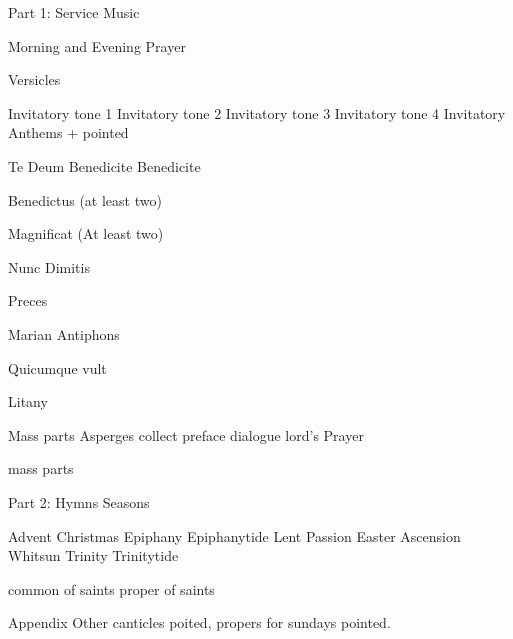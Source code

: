 Part 1: Service Music

Morning and Evening Prayer

Versicles

Invitatory tone 1
Invitatory tone 2
Invitatory tone 3
Invitatory tone 4
Invitatory Anthems + pointed

Te Deum
Benedicite
Benedicite

Benedictus (at least two)

Magnificat (At least two)

Nunc Dimitis

Preces

Marian Antiphons
 
Quicumque vult

Litany

Mass parts
Asperges
collect
preface dialogue
lord's Prayer

mass parts


Part 2: Hymns
Seasons

Advent
Christmas
Epiphany
Epiphanytide
Lent
Passion
Easter
Ascension
Whitsun
Trinity
Trinitytide

common of saints
proper of saints

Appendix
Other canticles poited,
propers for sundays pointed.
